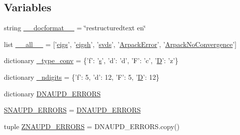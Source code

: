 \subsection*{Variables}
\begin{DoxyCompactItemize}
\item 
string \hyperlink{namespacescipy_1_1sparse_1_1linalg_1_1eigen_1_1arpack_1_1arpack_ad1559f9dc9a7f569f368a15d8fad5dc0}{\+\_\+\+\_\+docformat\+\_\+\+\_\+} = \char`\"{}restructuredtext en\char`\"{}
\item 
list \hyperlink{namespacescipy_1_1sparse_1_1linalg_1_1eigen_1_1arpack_1_1arpack_add7f2c4a7cbd733e3cdf7c826b63242d}{\+\_\+\+\_\+all\+\_\+\+\_\+} = \mbox{[}'\hyperlink{namespacescipy_1_1sparse_1_1linalg_1_1eigen_1_1arpack_1_1arpack_a5a66e1e3ca3773a1cd1dca77ce5ccbed}{eigs}', '\hyperlink{namespacescipy_1_1sparse_1_1linalg_1_1eigen_1_1arpack_1_1arpack_ada30d9d4dc4c6d396150fdc8f5ff2f47}{eigsh}', '\hyperlink{namespacescipy_1_1sparse_1_1linalg_1_1eigen_1_1arpack_1_1arpack_ac8400890fbf4123c780da90888931ec3}{svds}', '\hyperlink{classscipy_1_1sparse_1_1linalg_1_1eigen_1_1arpack_1_1arpack_1_1ArpackError}{Arpack\+Error}', '\hyperlink{classscipy_1_1sparse_1_1linalg_1_1eigen_1_1arpack_1_1arpack_1_1ArpackNoConvergence}{Arpack\+No\+Convergence}'\mbox{]}
\item 
dictionary \hyperlink{namespacescipy_1_1sparse_1_1linalg_1_1eigen_1_1arpack_1_1arpack_afea086de72b632d2df0dc66544962cdf}{\+\_\+type\+\_\+conv} = \{'f'\+: '\hyperlink{indexexpr_8h_ae024b0db549122b44c349ae28ec990dc}{s}', 'd'\+: 'd', 'F'\+: 'c', '\hyperlink{odrpack_8h_a7dae6ea403d00f3687f24a874e67d139}{D}'\+: 'z'\}
\item 
dictionary \hyperlink{namespacescipy_1_1sparse_1_1linalg_1_1eigen_1_1arpack_1_1arpack_a0faa7b6a83b8697f2c3cdac51de26233}{\+\_\+ndigits} = \{'f'\+: 5, 'd'\+: 12, 'F'\+: 5, '\hyperlink{odrpack_8h_a7dae6ea403d00f3687f24a874e67d139}{D}'\+: 12\}
\item 
dictionary \hyperlink{namespacescipy_1_1sparse_1_1linalg_1_1eigen_1_1arpack_1_1arpack_a987ca4aadd547b4ad858ee382218f7ab}{D\+N\+A\+U\+P\+D\+\_\+\+E\+R\+R\+O\+R\+S}
\item 
\hyperlink{namespacescipy_1_1sparse_1_1linalg_1_1eigen_1_1arpack_1_1arpack_a3cccb91bf65be251bd54cf2ef01f4274}{S\+N\+A\+U\+P\+D\+\_\+\+E\+R\+R\+O\+R\+S} = \hyperlink{namespacescipy_1_1sparse_1_1linalg_1_1eigen_1_1arpack_1_1arpack_a987ca4aadd547b4ad858ee382218f7ab}{D\+N\+A\+U\+P\+D\+\_\+\+E\+R\+R\+O\+R\+S}
\item 
tuple \hyperlink{namespacescipy_1_1sparse_1_1linalg_1_1eigen_1_1arpack_1_1arpack_ab93c60eb0f00c8d58982d9efe6a47054}{Z\+N\+A\+U\+P\+D\+\_\+\+E\+R\+R\+O\+R\+S} = D\+N\+A\+U\+P\+D\+\_\+\+E\+R\+R\+O\+R\+S.\+copy()

\end{DoxyCompactItemize}
